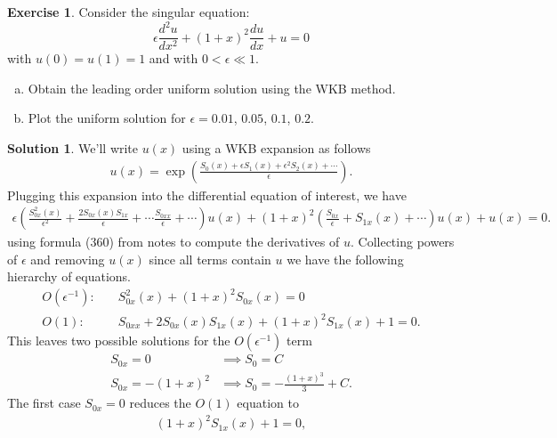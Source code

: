 \documentclass[12pt]{article}
\theoremstyle{definition}
\newtheorem{exer}{Exercise}
\newtheorem{sol}{Solution}
\theoremstyle{remark}
\begin{document}
\begin{exer}

Consider the singular equation:
\begin{equation*}
    \epsilon \frac{d^{2} u}{dx^{2}} + (1 + x)^{2} \frac{d u}{d x} + u = 0
\end{equation*}
with $u(0) = u(1) = 1$ and with $0 < \epsilon \ll 1$.
\begin{enumerate}[(a)]
    \item Obtain the leading order uniform solution using the WKB method.
    \item Plot the uniform solution for $\epsilon = 0.01$, $0.05$,  $0.1$,  $0.2$.
\end{enumerate}
\end{exer}

\begin{sol}
    We'll write $u(x)$ using a WKB expansion as follows
    \begin{align*}
        u(x) = \exp\left(  \frac{S_{0}(x) + \epsilon S_{1}(x) + \epsilon^{2} S_{2}(x) + \cdots }{\epsilon} \right).
    \end{align*}
Plugging this expansion into the differential equation of interest, we have
\begin{align*}
    \epsilon \left(  \frac{S_{0x}^{2}(x)}{\epsilon^{2}}+ \frac{2 S_{0x}(x) S_{1x}}{\epsilon}  + \cdots \frac{S_{0xx}}{\epsilon} + \cdots  \right) u(x) +   (1 + x)^{2} \left( \frac{S_{0x}}{\epsilon} + S_{1x}(x) + \cdots    \right) u(x) + u(x) = 0.
\end{align*}
using formula (360) from notes to compute the derivatives of $u$. Collecting powers of $\epsilon$ and removing  $u(x)$ since all terms contain $u$ we have the following hierarchy of equations.
\begin{align*}
    O(\epsilon^{-1}):& \quad S_{0x}^{2}(x) + (1+x)^{2} S_{0x}(x) = 0\\
    O(1):& \quad S_{0xx} + 2 S_{0x}(x) S_{1x}(x) + (1+x)^{2} S_{1x}(x) + 1 = 0.
\end{align*}
This leaves two possible solutions for the $O(\epsilon^{-1})$ term
\begin{align*}
    S_{0x} = 0 &\implies S_{0} = C\\
    S_{0x} = -(1 + x)^{2} &\implies S_{0} = - \frac{(1 + x)^{3}}{3} + C.
\end{align*}
The first case $S_{0x}=0$ reduces the  $O(1)$ equation to
\begin{align*}
    (1+x)^{2} S_{1x}(x) + 1 = 0,
\end{align*}

\end{sol}
\end{document}
